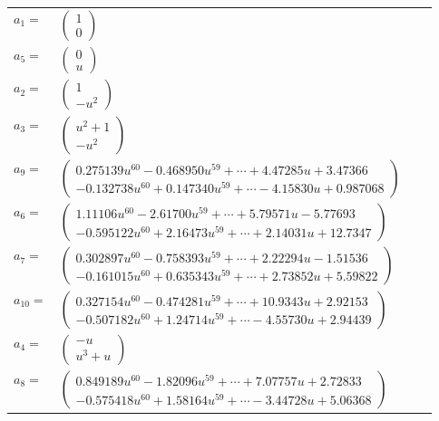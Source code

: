 \documentclass[1p]{elsarticle_modified}
\theoremstyle{definition}
\begin{document}
\begin{tabular}{m{7pt} m{180pt} m{7pt} m{180pt} }
\flushright $a_{1}=$&$\begin{pmatrix}1\\0\end{pmatrix}$ \\
\flushright $a_{5}=$&$\begin{pmatrix}0\\u\end{pmatrix}$ \\
\flushright $a_{2}=$&$\begin{pmatrix}1\\- u^2\end{pmatrix}$ \\
\flushright $a_{3}=$&$\begin{pmatrix}u^2+1\\- u^2\end{pmatrix}$ \\
\flushright $a_{9}=$&$\begin{pmatrix}0.275139 u^{60}-0.468950 u^{59}+\cdots+4.47285 u+3.47366\\-0.132738 u^{60}+0.147340 u^{59}+\cdots-4.15830 u+0.987068\end{pmatrix}$ \\
\flushright $a_{6}=$&$\begin{pmatrix}1.11106 u^{60}-2.61700 u^{59}+\cdots+5.79571 u-5.77693\\-0.595122 u^{60}+2.16473 u^{59}+\cdots+2.14031 u+12.7347\end{pmatrix}$ \\
\flushright $a_{7}=$&$\begin{pmatrix}0.302897 u^{60}-0.758393 u^{59}+\cdots+2.22294 u-1.51536\\-0.161015 u^{60}+0.635343 u^{59}+\cdots+2.73852 u+5.59822\end{pmatrix}$ \\
\flushright $a_{10}=$&$\begin{pmatrix}0.327154 u^{60}-0.474281 u^{59}+\cdots+10.9343 u+2.92153\\-0.507182 u^{60}+1.24714 u^{59}+\cdots-4.55730 u+2.94439\end{pmatrix}$ \\
\flushright $a_{4}=$&$\begin{pmatrix}- u\\u^3+u\end{pmatrix}$ \\
\flushright $a_{8}=$&$\begin{pmatrix}0.849189 u^{60}-1.82096 u^{59}+\cdots+7.07757 u+2.72833\\-0.575418 u^{60}+1.58164 u^{59}+\cdots-3.44728 u+5.06368\end{pmatrix}$ \\

\end{tabular}
\end{document}
